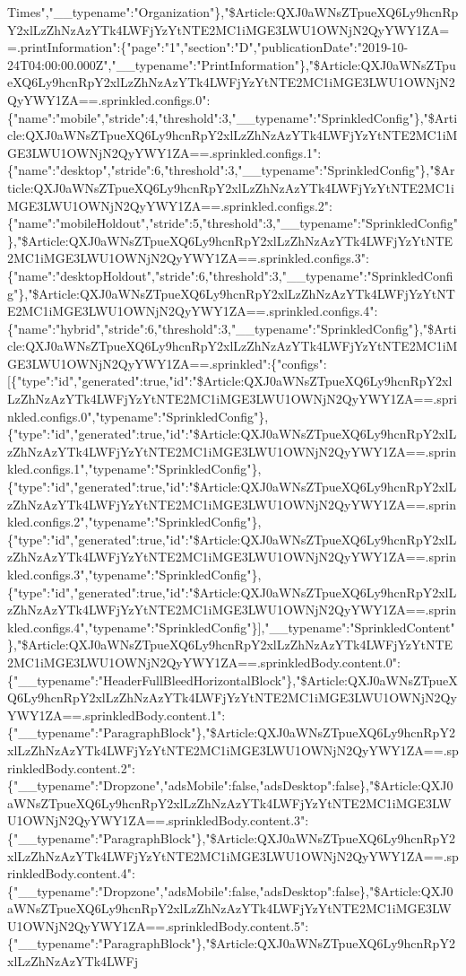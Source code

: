 Times","\_\_typename":"Organization"\},"\$Article:QXJ0aWNsZTpueXQ6Ly9hcnRpY2xlLzZhNzAzYTk4LWFjYzYtNTE2MC1iMGE3LWU1OWNjN2QyYWY1ZA==.printInformation":\{"page":"1","section":"D","publicationDate":"2019-10-24T04:00:00.000Z","\_\_typename":"PrintInformation"\},"\$Article:QXJ0aWNsZTpueXQ6Ly9hcnRpY2xlLzZhNzAzYTk4LWFjYzYtNTE2MC1iMGE3LWU1OWNjN2QyYWY1ZA==.sprinkled.configs.0":\{"name":"mobile","stride":4,"threshold":3,"\_\_typename":"SprinkledConfig"\},"\$Article:QXJ0aWNsZTpueXQ6Ly9hcnRpY2xlLzZhNzAzYTk4LWFjYzYtNTE2MC1iMGE3LWU1OWNjN2QyYWY1ZA==.sprinkled.configs.1":\{"name":"desktop","stride":6,"threshold":3,"\_\_typename":"SprinkledConfig"\},"\$Article:QXJ0aWNsZTpueXQ6Ly9hcnRpY2xlLzZhNzAzYTk4LWFjYzYtNTE2MC1iMGE3LWU1OWNjN2QyYWY1ZA==.sprinkled.configs.2":\{"name":"mobileHoldout","stride":5,"threshold":3,"\_\_typename":"SprinkledConfig"\},"\$Article:QXJ0aWNsZTpueXQ6Ly9hcnRpY2xlLzZhNzAzYTk4LWFjYzYtNTE2MC1iMGE3LWU1OWNjN2QyYWY1ZA==.sprinkled.configs.3":\{"name":"desktopHoldout","stride":6,"threshold":3,"\_\_typename":"SprinkledConfig"\},"\$Article:QXJ0aWNsZTpueXQ6Ly9hcnRpY2xlLzZhNzAzYTk4LWFjYzYtNTE2MC1iMGE3LWU1OWNjN2QyYWY1ZA==.sprinkled.configs.4":\{"name":"hybrid","stride":6,"threshold":3,"\_\_typename":"SprinkledConfig"\},"\$Article:QXJ0aWNsZTpueXQ6Ly9hcnRpY2xlLzZhNzAzYTk4LWFjYzYtNTE2MC1iMGE3LWU1OWNjN2QyYWY1ZA==.sprinkled":\{"configs":{[}\{"type":"id","generated":true,"id":"\$Article:QXJ0aWNsZTpueXQ6Ly9hcnRpY2xlLzZhNzAzYTk4LWFjYzYtNTE2MC1iMGE3LWU1OWNjN2QyYWY1ZA==.sprinkled.configs.0","typename":"SprinkledConfig"\},\{"type":"id","generated":true,"id":"\$Article:QXJ0aWNsZTpueXQ6Ly9hcnRpY2xlLzZhNzAzYTk4LWFjYzYtNTE2MC1iMGE3LWU1OWNjN2QyYWY1ZA==.sprinkled.configs.1","typename":"SprinkledConfig"\},\{"type":"id","generated":true,"id":"\$Article:QXJ0aWNsZTpueXQ6Ly9hcnRpY2xlLzZhNzAzYTk4LWFjYzYtNTE2MC1iMGE3LWU1OWNjN2QyYWY1ZA==.sprinkled.configs.2","typename":"SprinkledConfig"\},\{"type":"id","generated":true,"id":"\$Article:QXJ0aWNsZTpueXQ6Ly9hcnRpY2xlLzZhNzAzYTk4LWFjYzYtNTE2MC1iMGE3LWU1OWNjN2QyYWY1ZA==.sprinkled.configs.3","typename":"SprinkledConfig"\},\{"type":"id","generated":true,"id":"\$Article:QXJ0aWNsZTpueXQ6Ly9hcnRpY2xlLzZhNzAzYTk4LWFjYzYtNTE2MC1iMGE3LWU1OWNjN2QyYWY1ZA==.sprinkled.configs.4","typename":"SprinkledConfig"\}{]},"\_\_typename":"SprinkledContent"\},"\$Article:QXJ0aWNsZTpueXQ6Ly9hcnRpY2xlLzZhNzAzYTk4LWFjYzYtNTE2MC1iMGE3LWU1OWNjN2QyYWY1ZA==.sprinkledBody.content.0":\{"\_\_typename":"HeaderFullBleedHorizontalBlock"\},"\$Article:QXJ0aWNsZTpueXQ6Ly9hcnRpY2xlLzZhNzAzYTk4LWFjYzYtNTE2MC1iMGE3LWU1OWNjN2QyYWY1ZA==.sprinkledBody.content.1":\{"\_\_typename":"ParagraphBlock"\},"\$Article:QXJ0aWNsZTpueXQ6Ly9hcnRpY2xlLzZhNzAzYTk4LWFjYzYtNTE2MC1iMGE3LWU1OWNjN2QyYWY1ZA==.sprinkledBody.content.2":\{"\_\_typename":"Dropzone","adsMobile":false,"adsDesktop":false\},"\$Article:QXJ0aWNsZTpueXQ6Ly9hcnRpY2xlLzZhNzAzYTk4LWFjYzYtNTE2MC1iMGE3LWU1OWNjN2QyYWY1ZA==.sprinkledBody.content.3":\{"\_\_typename":"ParagraphBlock"\},"\$Article:QXJ0aWNsZTpueXQ6Ly9hcnRpY2xlLzZhNzAzYTk4LWFjYzYtNTE2MC1iMGE3LWU1OWNjN2QyYWY1ZA==.sprinkledBody.content.4":\{"\_\_typename":"Dropzone","adsMobile":false,"adsDesktop":false\},"\$Article:QXJ0aWNsZTpueXQ6Ly9hcnRpY2xlLzZhNzAzYTk4LWFjYzYtNTE2MC1iMGE3LWU1OWNjN2QyYWY1ZA==.sprinkledBody.content.5":\{"\_\_typename":"ParagraphBlock"\},"\$Article:QXJ0aWNsZTpueXQ6Ly9hcnRpY2xlLzZhNzAzYTk4LWFj